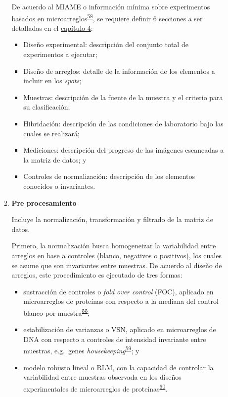\documentclass[]{article}
\providecommand{\tightlist}{%
  \setlength{\itemsep}{0pt}\setlength{\parskip}{0pt}}
\begin{document}
\begin{enumerate}
\begin{enumerate}
\begin{enumerate}
      De acuerdo al MIAME o información mínima sobre experimentos
      basados en
      microarreglos\textsuperscript{\protect\hyperlink{ref-brazma2001}{58}},
      se requiere definir 6 secciones a ser detalladas en el
      \protect\hyperlink{meto}{capítulo 4}:

      \begin{itemize}
      \tightlist
      \item
        Diseño experimental: descripción del conjunto total de
        experimentos a ejecutar;
      \item
        Diseño de arreglos: detalle de la información de los elementos a
        incluir en los \emph{spots};
      \item
        Muestras: descripción de la fuente de la muestra y el criterio
        para su clasificación;
      \item
        Hibridación: descripción de las condiciones de laboratorio bajo
        las cuales se realizará;
      \item
        Mediciones: descripción del progreso de las imágenes escaneadas
        a la matriz de datos; y
      \item
        Controles de normalización: descripción de los elementos
        conocidos o invariantes.
      \end{itemize}
    \item
      \textbf{Pre procesamiento}

      Incluye la normalización, transformación y filtrado de la matriz
      de datos.

      Primero, la normalización busca homogeneizar la variabilidad entre
      arreglos en base a controles (blanco, negativos o positivos), los
      cuales se asume que son invariantes entre muestras. De acuerdo al
      diseño de arreglos, este procedimiento es ejecutado de tres
      formas:

      \begin{itemize}
      \tightlist
      \item
        sustracción de controles o \emph{fold over control} (FOC),
        aplicado en microarreglos de proteínas con respecto a la mediana
        del control blanco por
        muestra\textsuperscript{\protect\hyperlink{ref-King2015FOC}{55}};
      \item
        estabilización de varianzas o VSN, aplicado en microarreglos de
        DNA con respecto a controles de intensidad invariante entre
        muestras, e.g.~genes
        \emph{housekeeping}\textsuperscript{\protect\hyperlink{ref-huber2002vsn}{59}};
        y
      \item
        modelo robusto lineal o RLM, con la capacidad de controlar la
        variabilidad entre muestras observada en los diseños
        experimentales de microarreglos de
        proteínas\textsuperscript{\protect\hyperlink{ref-sboner2009rlm}{60}}.
      \end{itemize}


\end{enumerate}
\end{enumerate}
\end{enumerate}
\end{document}
